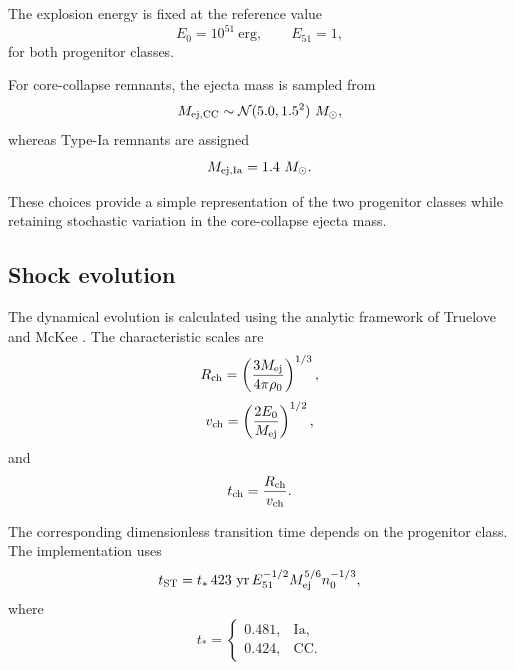 \documentclass[
aps,
prd,
reprint,
superscriptaddress,
nofootinbib
]{revtex4-2}
\newcommand{\yr}{\mathrm{yr}}
\newcommand{\erg}{\mathrm{erg}}
\newcommand{\Msun}{M_{\odot}}
\newcommand{\CC}{\mathrm{CC}}
\newcommand{\Ia}{\mathrm{Ia}}
\begin{document}
	The explosion energy is fixed at the reference value
	\begin{equation}
		E_0=10^{51}~\erg,
		\qquad
		E_{51}=1,
		\label{eq:energy}
	\end{equation}
	for both progenitor classes.
	
	For core-collapse remnants, the ejecta mass is sampled from
	\begin{equation}
		M_{\rm ej,CC}
		\sim
		{\cal N}(5.0,1.5^2)~\Msun,
		\label{eq:mejcc}
	\end{equation}
	whereas Type-Ia remnants are assigned
	\begin{equation}
		M_{\rm ej,Ia}=1.4~\Msun.
		\label{eq:mejia}
	\end{equation}
	
	These choices provide a simple representation of the two progenitor classes
	while retaining stochastic variation in the core-collapse ejecta mass.
	
	\subsection{Shock evolution}
	\label{sec:shock}
	
	The dynamical evolution is calculated using the analytic framework of
	Truelove and McKee \cite{Truelove1999}.  The characteristic scales are
	\begin{equation}
		R_{\rm ch}
		=
		\left(
		\frac{3M_{\rm ej}}
		{4\pi\rho_0}
		\right)^{1/3},
		\label{eq:rchar}
	\end{equation}
	\begin{equation}
		v_{\rm ch}
		=
		\left(
		\frac{2E_0}{M_{\rm ej}}
		\right)^{1/2},
		\label{eq:vchar}
	\end{equation}
	and
	\begin{equation}
		t_{\rm ch}
		=
		\frac{R_{\rm ch}}{v_{\rm ch}}.
		\label{eq:tchar}
	\end{equation}
	
	The corresponding dimensionless transition time depends on the progenitor
	class.  The implementation uses
	\begin{equation}
		t_{\rm ST}
		=
		t_\ast\,423~\yr\,
		E_{51}^{-1/2}
		M_{\rm ej}^{5/6}
		n_0^{-1/3},
		\label{eq:tst}
	\end{equation}
	where
	\begin{equation}
		t_\ast=
		\begin{cases}
			0.481,&\Ia,\\
			0.424,&\CC.
		\end{cases}
	\end{equation}
	
\end{document}
